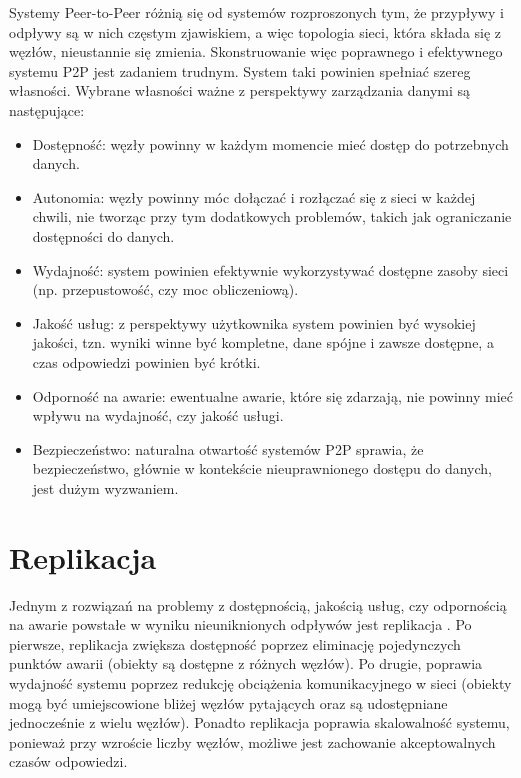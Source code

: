 \documentclass[12pt, twoside, openany]{report}
\begin{document}
Systemy Peer-to-Peer różnią się od systemów rozproszonych tym, że przypływy i odpływy są w nich częstym zjawiskiem, a więc topologia sieci, która składa się z węzłów, nieustannie się zmienia. Skonstruowanie więc poprawnego i efektywnego systemu P2P jest zadaniem trudnym. System taki powinien spełniać szereg własności. Wybrane własności ważne z perspektywy zarządzania danymi \cite{bib:martins} są następujące:
\begin{itemize}
\item Dostępność: węzły powinny w każdym momencie mieć dostęp do potrzebnych danych.
\item Autonomia: węzły powinny móc dołączać i rozłączać się z sieci w każdej chwili, nie tworząc przy tym dodatkowych problemów, takich jak ograniczanie dostępności do danych.
\item Wydajność: system powinien efektywnie wykorzystywać dostępne zasoby sieci (np. przepustowość, czy moc obliczeniową).
\item Jakość usług: z perspektywy użytkownika system powinien być wysokiej jakości, tzn. wyniki winne być kompletne, dane spójne i zawsze dostępne, a czas odpowiedzi powinien być krótki.
\item Odporność na awarie: ewentualne awarie, które się zdarzają, nie powinny mieć wpływu na wydajność, czy jakość usługi.
\item Bezpieczeństwo: naturalna otwartość systemów P2P sprawia, że bezpieczeństwo, głównie w kontekście nieuprawnionego dostępu do danych, jest dużym wyzwaniem.
\end{itemize}

\section{Replikacja}
\label{replikacja}

Jednym z rozwiązań na problemy z dostępnością, jakością usług, czy odpornością na awarie powstałe w wyniku nieuniknionych odpływów jest replikacja \cite{bib:martins}. Po pierwsze, replikacja zwiększa dostępność poprzez eliminację pojedynczych punktów awarii (obiekty są dostępne z różnych węzłów). Po drugie, poprawia wydajność systemu poprzez redukcję obciążenia komunikacyjnego w sieci (obiekty mogą być umiejscowione bliżej węzłów pytających oraz są udostępniane jednocześnie z wielu węzłów). Ponadto replikacja poprawia skalowalność systemu, ponieważ przy wzroście liczby węzłów, możliwe jest zachowanie akceptowalnych czasów odpowiedzi.
\end{document}
